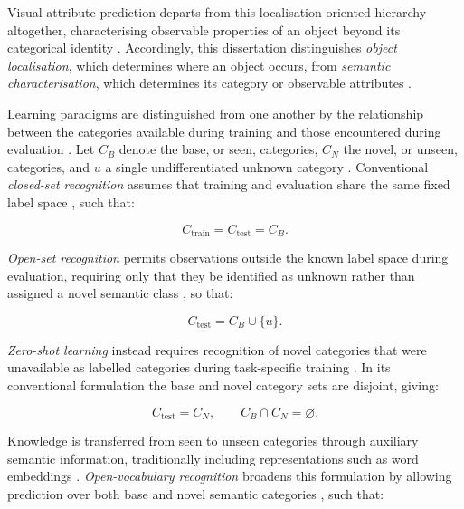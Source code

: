 Visual attribute prediction departs from this localisation-oriented hierarchy altogether, characterising observable properties of an object beyond its categorical identity \cite{BG41-visual-attributes}. Accordingly, this dissertation distinguishes \emph{object localisation}, which determines where an object occurs, from \emph{semantic characterisation}, which determines its category or observable attributes \cite{BG33-object-detection,BG41-visual-attributes}.

\newpage
\noindent Learning paradigms are distinguished from one another by the relationship between the categories available during training and those encountered during evaluation \cite{wu2024openvocabulary,zhu2024openvocabulary,cao2025zeroshot}. Let \(C_B\) denote the base, or seen, categories, \(C_N\) the novel, or unseen, categories, and \(u\) a single undifferentiated unknown category \cite{wu2024openvocabulary}. Conventional \emph{closed-set recognition} assumes that training and evaluation share the same fixed label space \cite{wu2024openvocabulary}, such that:

\begin{equation}
C_{\mathrm{train}} = C_{\mathrm{test}} = C_B.
\end{equation}

\noindent \emph{Open-set recognition} permits observations outside the known label space during evaluation, requiring only that they be identified as unknown rather than assigned a novel semantic class \cite{wu2024openvocabulary,cao2025zeroshot}, so that:

\begin{equation}
C_{\mathrm{test}} = C_B \cup \{u\}.
\end{equation}

\noindent \emph{Zero-shot learning} instead requires recognition of novel categories that were unavailable as labelled categories during task-specific training \cite{wu2024openvocabulary,cao2025zeroshot}. In its conventional formulation the base and novel category sets are disjoint, giving:

\begin{equation}
C_{\mathrm{test}} = C_N,
\qquad
C_B \cap C_N = \varnothing.
\end{equation}

\noindent Knowledge is transferred from seen to unseen categories through auxiliary semantic information, traditionally including representations such as word embeddings \cite{zhu2024openvocabulary,cao2025zeroshot}. \emph{Open-vocabulary recognition} broadens this formulation by allowing prediction over both base and novel semantic categories \cite{wu2024openvocabulary,zhu2024openvocabulary}, such that:

